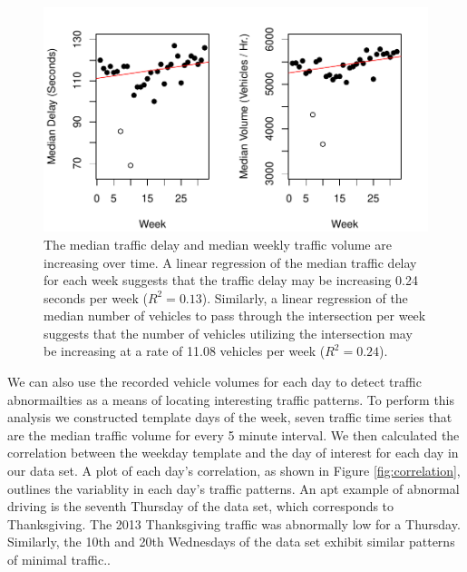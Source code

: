 \documentclass{report}
\begin{document}
\begin{figure}[H]
\centering

\includegraphics{upstat_report-VolumePlot}
\caption{ The median traffic delay and median weekly
traffic volume are increasing over time. A linear regression of the median
traffic delay for each week suggests that the traffic delay may be increasing
0.24 seconds per week
($R^2 = 0.13$). Similarly, a linear
regression of the median number of vehicles to pass through the intersection per
week suggests that the number of vehicles utilizing the intersection may be
increasing at a rate of 11.08 vehicles
per week ($R^2 = 0.24$).}
\label{trends}
\end{figure}

We can also use the recorded vehicle volumes for each day to detect traffic
abnormailties as a means of locating interesting traffic patterns. To perform this
analysis we constructed template days of the week, seven traffic time series that
are the median traffic volume for every 5 minute interval. We then calculated the
correlation between the weekday template and the day of interest for each day in
our data set. A plot of each day's correlation, as shown in Figure \ref{fig:correlation},
outlines the variablity in each day's traffic patterns. An apt example of abnormal
driving is the seventh Thursday of the data set, which corresponds to Thanksgiving.
The 2013 Thanksgiving traffic was abnormally low for a Thursday. Similarly, the
10th and 20th Wednesdays of the data set exhibit similar patterns of minimal traffic..
\end{document}
